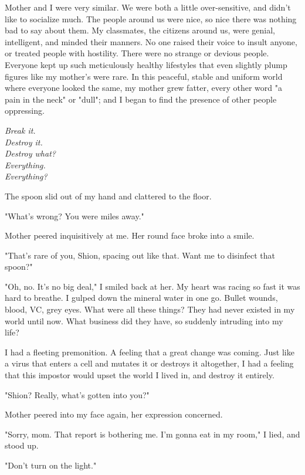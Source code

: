 Mother and I were very similar. We were both a little over-sensitive,
and didn't like to socialize much. The people around us were nice, so
nice there was nothing bad to say about them. My classmates, the
citizens around us, were genial, intelligent, and minded their manners.
No one raised their voice to insult anyone, or treated people with
hostility. There were no strange or devious people. Everyone kept up
such meticulously healthy lifestyles that even slightly plump figures
like my mother's were rare. In this peaceful, stable and uniform world
where everyone looked the same, my mother grew fatter, every other word
"a pain in the neck" or "dull"; and I began to find the presence of
other people oppressing.

\myspace

\emph{Break it.\\
	Destroy it.\\
	Destroy what?\\
	Everything.\\
	Everything?}

\myspace

The spoon slid out of my hand and clattered to the floor.

"What's wrong? You were miles away."

Mother peered inquisitively at me. Her round face broke into a smile.

"That's rare of you, Shion, spacing out like that. Want me to disinfect
that spoon?"

"Oh, no. It's no big deal," I smiled back at her. My heart was racing so
fast it was hard to breathe. I gulped down the mineral water in one go.
Bullet wounds, blood, VC, grey eyes. What were all these things? They
had never existed in my world until now. What business did they have, so
suddenly intruding into my life?

I had a fleeting premonition. A feeling that a great change was coming.
Just like a virus that enters a cell and mutates it or destroys it
altogether, I had a feeling that this impostor would upset the world I
lived in, and destroy it entirely.

"Shion? Really, what's gotten into you?"

Mother peered into my face again, her expression concerned.

"Sorry, mom. That report is bothering me. I'm gonna eat in my room," I
lied, and stood up.

\mybreak

"Don't turn on the light."

